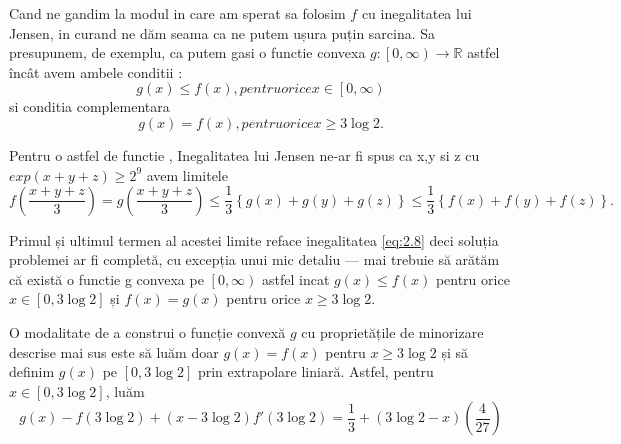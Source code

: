 \documentclass[a4paper,12pt,oneside]{report}
\begin{document}
Cand ne gandim la modul in care am sperat sa folosim \(f\) cu inegalitatea lui Jensen, in curand ne dăm seama ca ne putem ușura puțin sarcina. Sa presupunem, de exemplu, ca putem gasi o functie convexa \(g : \left [ 0 , \infty  \right ) \to \mathbb{R}\) astfel încât avem ambele conditii : 
\begin{displaymath}
  g\left ( x \right ) \leq  f\left ( x  \right ), pentru orice x \in  \left [ 0 , \infty  \right )    \label{eq:2.9} \tag{2.9}
\end{displaymath}
si conditia complementara
\begin{displaymath}
  g \left ( x \right ) = f \left ( x \right ) , pentru orice  x\geq 3 \log 2. \label{eq:2.10} \tag{2.10}
\end{displaymath}

Pentru o astfel de functie , Inegalitatea lui Jensen ne-ar fi spus ca x,y si z cu \(exp \left ( x + y + z \right )\geq  2^{9} \) avem limitele  
\begin{displaymath}
  f\left ( \frac{x + y + z}{3} \right ) = g\left ( \frac{x + y + z}{3} \right ) \leq  \frac{1}{3}\left \{ g\left ( x \right ) + g\left ( y \right ) + g\left ( z \right ) \right \} \leq  \frac{1}{3}\left \{ f\left ( x \right ) + f\left ( y \right ) + f\left ( z \right ) \right \} .
\end{displaymath}

Primul și ultimul termen al acestei limite reface inegalitatea \ref{eq:2.8} deci soluția problemei ar fi completă, cu excepția unui mic detaliu — mai trebuie să arătăm că există o functie  g convexa pe \( \left [ 0 , \infty  \right ) \) astfel incat  \(g\left ( x \right ) \leq  f\left ( x \right )\) pentru orice  \(x \in \left [ 0 , 3\log 2 \right ]\) și \( f\left ( x \right ) = g\left ( x \right )\) pentru orice \( x \geq 3\log 2\).

O modalitate de a construi o funcție convexă \(g\) cu proprietățile de minorizare descrise mai sus este să luăm doar \(g\left ( x \right ) = f\left ( x \right )\) pentru \(x \geq  3\log2\) și să definim \(g\left ( x \right )\) pe \(\left [ 0 , 3\log 2 \right ]\) prin extrapolare liniară. Astfel, pentru \(x\in \left [ 0 , 3\log 2 \right ]\), luăm
\begin{displaymath}
  g\left ( x \right ) - f\left ( 3\log 2 \right ) + \left ( x - 3\log 2 \right ){f}'\left ( 3\log2 \right ) = \frac{1}{3} + \left ( 3\log2 - x  \right )\left ( \frac{4}{27} \right )
\end{displaymath}
\end{document}
